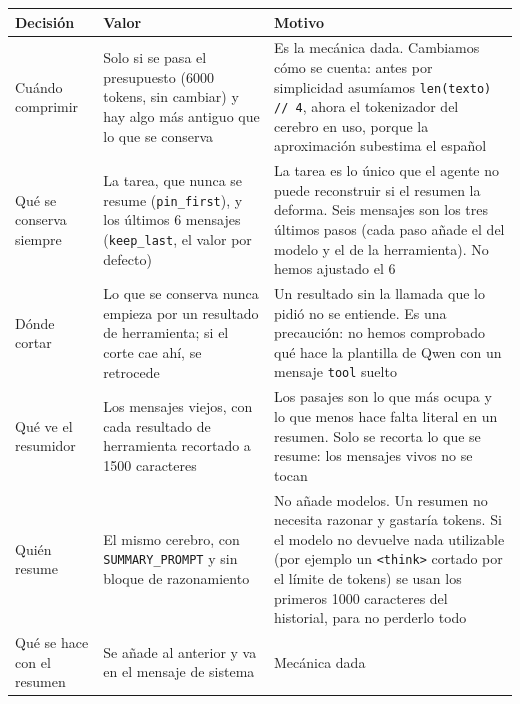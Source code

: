 {\def\LTcaptype{none} %
\small\setlength{\tabcolsep}{3pt}
\begin{longtable}[]{@{}
  >{\raggedright\arraybackslash}p{}
  >{\raggedright\arraybackslash}p{}
  >{\raggedright\arraybackslash}p{}@{}}
\toprule\noalign{}
\begin{minipage}[b]{\linewidth}\raggedright
Decisión
\end{minipage} & \begin{minipage}[b]{\linewidth}\raggedright
Valor
\end{minipage} & \begin{minipage}[b]{\linewidth}\raggedright
Motivo
\end{minipage} \\
\midrule\noalign{}
\endhead
\bottomrule\noalign{}
\endlastfoot
Cuándo comprimir & Solo si se pasa el presupuesto (6000 tokens, sin cambiar) y hay algo más antiguo que lo que se conserva & Es la mecánica dada. Cambiamos cómo se cuenta: antes por simplicidad asumíamos \texttt{len(texto) /\allowbreak{}/\allowbreak{} 4}, ahora el tokenizador del cerebro en uso, porque la aproximación subestima el español \\
Qué se conserva siempre & La tarea, que nunca se resume (\texttt{pin\_\allowbreak{}first}), y los últimos 6 mensajes (\texttt{keep\_\allowbreak{}last}, el valor por defecto) & La tarea es lo único que el agente no puede reconstruir si el resumen la deforma. Seis mensajes son los tres últimos pasos (cada paso añade el del modelo y el de la herramienta). No hemos ajustado el 6 \\
Dónde cortar & Lo que se conserva nunca empieza por un resultado de herramienta; si el corte cae ahí, se retrocede & Un resultado sin la llamada que lo pidió no se entiende. Es una precaución: no hemos comprobado qué hace la plantilla de Qwen con un mensaje \texttt{tool} suelto \\
Qué ve el resumidor & Los mensajes viejos, con cada resultado de herramienta recortado a 1500 caracteres & Los pasajes son lo que más ocupa y lo que menos hace falta literal en un resumen. Solo se recorta lo que se resume: los mensajes vivos no se tocan \\
Quién resume & El mismo cerebro, con \texttt{SUMMARY\_\allowbreak{}PROMPT} y sin bloque de razonamiento & No añade modelos. Un resumen no necesita razonar y gastaría tokens. Si el modelo no devuelve nada utilizable (por ejemplo un \texttt{\textless{}think\textgreater{}} cortado por el límite de tokens) se usan los primeros 1000 caracteres del historial, para no perderlo todo \\
Qué se hace con el resumen & Se añade al anterior y va en el mensaje de sistema & Mecánica dada \\
\end{longtable}
}

